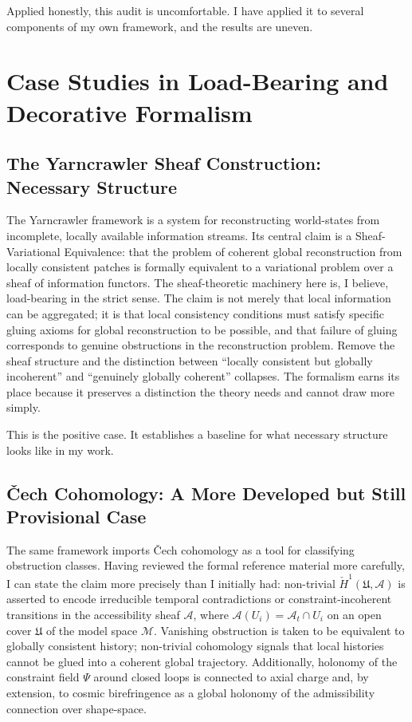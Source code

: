 \documentclass[12pt, a4paper]{article}
\begin{document}
Applied honestly, this audit is uncomfortable. I have applied it to several components of my own framework, and the results are uneven.

\section{Case Studies in Load-Bearing and Decorative Formalism}

\subsection{The Yarncrawler Sheaf Construction: Necessary Structure}

The Yarncrawler framework is a system for reconstructing world-states from incomplete, locally available information streams. Its central claim is a Sheaf-Variational Equivalence: that the problem of coherent global reconstruction from locally consistent patches is formally equivalent to a variational problem over a sheaf of information functors. The sheaf-theoretic machinery here is, I believe, load-bearing in the strict sense. The claim is not merely that local information can be aggregated; it is that local consistency conditions must satisfy specific gluing axioms for global reconstruction to be possible, and that failure of gluing corresponds to genuine obstructions in the reconstruction problem. Remove the sheaf structure and the distinction between \enquote{locally consistent but globally incoherent} and \enquote{genuinely globally coherent} collapses. The formalism earns its place because it preserves a distinction the theory needs and cannot draw more simply.

This is the positive case. It establishes a baseline for what necessary structure looks like in my work.

\subsection{\v{C}ech Cohomology: A More Developed but Still Provisional Case}

The same framework imports \v{C}ech cohomology as a tool for classifying obstruction classes. Having reviewed the formal reference material more carefully, I can state the claim more precisely than I initially had: non-trivial $\check{H}^1(\mathfrak{U}, \mathscr{A})$ is asserted to encode irreducible temporal contradictions or constraint-incoherent transitions in the accessibility sheaf $\mathscr{A}$, where $\mathscr{A}(U_i) = \mathcal{A}_t \cap U_i$ on an open cover $\mathfrak{U}$ of the model space $\mathcal{M}$. Vanishing obstruction is taken to be equivalent to globally consistent history; non-trivial cohomology signals that local histories cannot be glued into a coherent global trajectory. Additionally, holonomy of the constraint field $\Psi$ around closed loops is connected to axial charge and, by extension, to cosmic birefringence as a global holonomy of the admissibility connection over shape-space.
\end{document}
